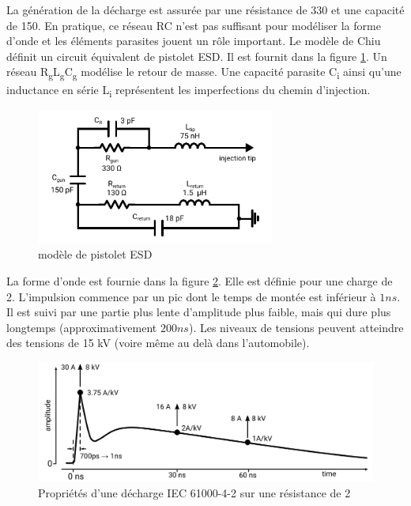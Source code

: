 La génération de la décharge est assurée par une résistance de 330\textOmega{} et une capacité de 150.
En pratique, ce réseau RC n'est pas suffisant pour modéliser la forme d'onde et les éléments parasites jouent un rôle important.
Le modèle de Chiu \cite{phd-chiu} définit un circuit équivalent de pistolet ESD.
Il est fournit dans la figure \ref{fig:esd-gun-model}.
Un réseau R\textsubscript{g}L\textsubscript{g}C\textsubscript{g} modélise le retour de masse.
Une capacité parasite C\textsubscript{i} ainsi qu'une inductance en série L\textsubscript{i} représentent les imperfections du chemin d'injection.

\begin{figure}[!h]
  \centering
  \includegraphics[width=0.7\textwidth]{src/1/figures/gun_model.pdf}
  \caption{modèle de pistolet ESD}
  \label{fig:esd-gun-model}
\end{figure}

La forme d'onde est fournie dans la figure \ref{iec_pulse}.
Elle est définie pour une charge de 2\textOmega{}.
L'impulsion commence par un pic dont le temps de montée est inférieur à $1ns$.
Il est suivi par une partie plus lente d'amplitude plus faible, mais qui dure plus longtemps (approximativement $200ns$).
Les niveaux de tensions peuvent atteindre des tensions de 15 kV (voire même au delà dans l'automobile).

\begin{figure}[!h]
  \centering
  \includegraphics[width=\textwidth]{src/1/figures/iec61000-4-2_waveform.pdf}
  \caption{Propriétés d'une décharge IEC 61000-4-2 sur une résistance de 2\textOmega{}}
  \label{iec_pulse}
\end{figure}

